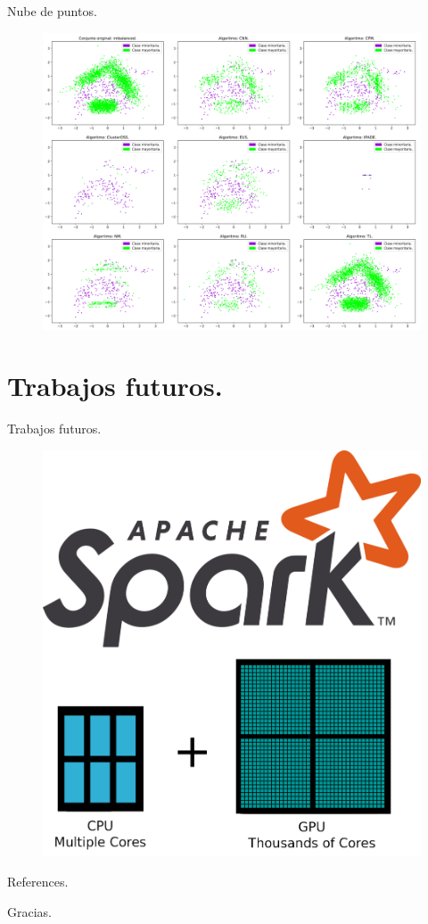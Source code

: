\documentclass[10pt]{beamer}
\begin{document}
\begin{frame}{Nube de puntos.}
\begin{figure}[H]
\includegraphics[scale=0.065]{./imagenes/np}
\end{figure}
\end{frame}

\section{Trabajos futuros.}

\begin{frame}{Trabajos futuros.}
\begin{figure}[H]
\centering
\includegraphics[scale=0.17]{./imagenes/spark_gpu}
\end{figure}
\end{frame}

\begin{frame}[allowframebreaks]{References.}
	
	
\end{frame}

\begin{frame}[standout]
  Gracias.
\end{frame}
\end{document}
